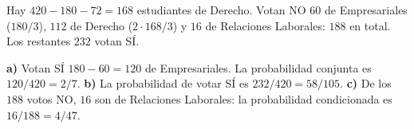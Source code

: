Hay $420-180-72=168$ estudiantes de Derecho. Votan NO
$60$ de Empresariales ($180/3$), $112$ de Derecho ($2\cdot168/3$)
y $16$ de Relaciones Laborales: $188$ en total. Los restantes $232$ votan SÍ.

\textbf{a)} Votan SÍ $180-60=120$ de Empresariales. La probabilidad
conjunta es $\boxed{120/420=2/7}$.
\textbf{b)} La probabilidad de votar SÍ es $\boxed{232/420=58/105}$.
\textbf{c)} De los $188$ votos NO, $16$ son de Relaciones Laborales:
la probabilidad condicionada es $\boxed{16/188=4/47}$.
